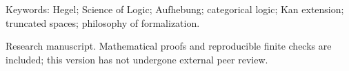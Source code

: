 \documentclass[11pt]{article}
\numberwithin{equation}{section}
\theoremstyle{plain}
\theoremstyle{definition}
\theoremstyle{remark}
\begin{document}
\begin{titlepage}
\begin{abstract}
interpretive warrant answerable together. The resulting comparison with
nLab and contemporary formalizations separates mathematical necessity
within a representation from justification of the relations and tests
that produce it.
\end{abstract}
\vfill
{\small\color{ink}Keywords: Hegel; Science of Logic; Aufhebung; categorical logic;
Kan extension; truncated spaces; philosophy of formalization.\par}
\vspace{3mm}
{\small Research manuscript. Mathematical proofs and reproducible finite checks
are included; this version has not undergone external peer review.\par}
\end{titlepage}
\hypersetup{pageanchor=true}
\begingroup\footnotesize\setlength{\parskip}{0pt}
\tableofcontents
\endgroup
\newpage
{}




\appendix

\end{document}
